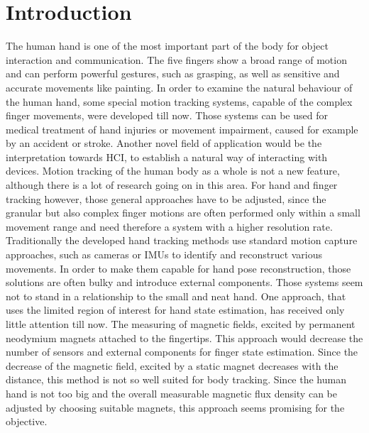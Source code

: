 
\lhead[\chaptername~\thechapter]{\rightmark}


\rhead[\leftmark]{}


\lfoot[\thepage]{}


\cfoot{}


\rfoot[]{\thepage}


\chapter{Introduction}

The human hand is one of the most important part of the body for object interaction and communication. The five fingers show a broad range of motion and can perform powerful gestures, such as grasping, as well as sensitive and accurate movements like painting. In order to examine the natural behaviour of the human hand, some special motion tracking systems, capable of the complex finger movements, were developed till now. Those systems can be used for medical treatment of hand injuries or movement impairment, caused for example by an accident or stroke. Another novel field of application would be the interpretation towards \ac{HCI}, to establish a natural way of interacting with devices. Motion tracking of the human body as a whole is not a new feature, although there is a lot of research going on in this area. For hand and finger tracking however, those general approaches have to be adjusted, since the granular but also complex finger motions are often performed only within a small movement range and need therefore a system with a higher resolution rate. Traditionally the developed hand tracking methods use standard motion capture approaches, such as cameras or \acp{IMU} to identify and reconstruct various movements. In order to make them capable for hand pose reconstruction, those solutions are often bulky and introduce external components. Those systems seem not to stand in a relationship to the small and neat hand. One approach, that uses the limited region of interest for hand state estimation, has received only little attention till now. The measuring of magnetic fields, excited by permanent neodymium magnets attached to the fingertips. This approach would decrease the number of sensors and external components for finger state estimation. Since the decrease of the magnetic field, excited by a static magnet decreases with the distance, this method is not so well suited for body tracking. Since the human hand is not too big and the overall measurable magnetic flux density can be adjusted by choosing suitable magnets, this approach seems promising for the objective.

